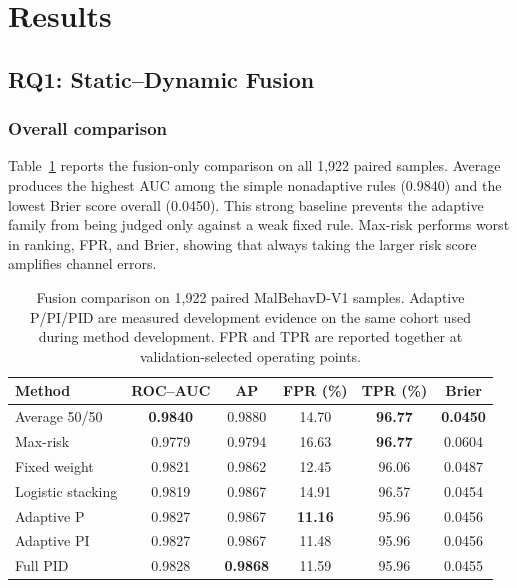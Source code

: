 \section{Results}
\label{sec:results}

\subsection{RQ1: Static--Dynamic Fusion}

\subsubsection{Overall comparison}

Table~\ref{tab:fusion-main} reports the fusion-only comparison on all 1,922
paired samples. Average produces the highest AUC among the simple nonadaptive
rules (0.9840) and the lowest Brier score overall (0.0450). This strong baseline
prevents the adaptive family from being judged only against a weak fixed rule.
Max-risk performs worst in ranking, FPR, and Brier, showing that always taking
the larger risk score amplifies channel errors.

\begin{table}[t]
\centering
\caption{Fusion comparison on 1,922 paired MalBehavD-V1 samples. Adaptive
P/PI/PID are measured development evidence on the same cohort used during method
development. FPR and TPR are reported together at validation-selected operating
points.}
\label{tab:fusion-main}
\small
\begin{tabular}{lccccc}
\toprule
Method & ROC--AUC & AP & FPR (\%) & TPR (\%) & Brier \\
\midrule
Average 50/50 & \textbf{0.9840} & 0.9880 & 14.70 & \textbf{96.77} & \textbf{0.0450} \\
Max-risk & 0.9779 & 0.9794 & 16.63 & \textbf{96.77} & 0.0604 \\
Fixed weight & 0.9821 & 0.9862 & 12.45 & 96.06 & 0.0487 \\
Logistic stacking & 0.9819 & 0.9867 & 14.91 & 96.57 & 0.0454 \\
Adaptive P & 0.9827 & 0.9867 & \textbf{11.16} & 95.96 & 0.0456 \\
Adaptive PI & 0.9827 & 0.9867 & 11.48 & 95.96 & 0.0456 \\
Full PID & 0.9828 & \textbf{0.9868} & 11.59 & 95.96 & 0.0455 \\
\bottomrule
\end{tabular}
\end{table}


